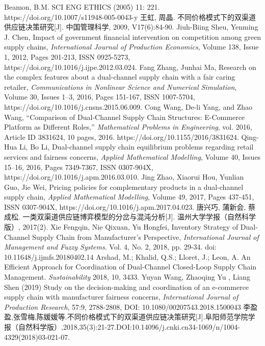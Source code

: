 \documentclass{article}
\begin{document}
\begin{thebibliography}{1}
 Beamon, B.M. SCI ENG ETHICS (2005) 11: 221. https://doi.org/10.1007/s11948-005-0043-y
 王虹, 周晶. 不同价格模式下的双渠道供应链决策研究[J]. 中国管理科学, 2009, V17(6):84-90.
 Jiuh-Biing Sheu, Yenming J. Chen, Impact of government financial intervention on competition among green supply chains, \emph{International Journal of Production Economics}, Volume 138, Issue 1, 2012, Pages 201-213, ISSN 0925-5273, https://doi.org/10.1016/j.ijpe.2012.03.024.
 Fang Zhang, Junhai Ma, Research on the complex features about a dual-channel supply chain with a fair caring retailer, \emph{Communications in Nonlinear Science and Numerical Simulation}, Volume 30, Issues 1–3, 2016, Pages 151-167, ISSN 1007-5704, https://doi.org/10.1016/j.cnsns.2015.06.009.
 Cong Wang, De-li Yang, and Zhao Wang, “Comparison of Dual-Channel Supply Chain Structures: E-Commerce Platform as Different Roles,” \emph{Mathematical Problems in Engineering}, vol. 2016, Article ID 3831624, 10 pages, 2016. https://doi.org/10.1155/2016/3831624.
 Qing-Hua Li, Bo Li, Dual-channel supply chain equilibrium problems regarding retail services and fairness concerns, \emph{Applied Mathematical Modelling}, Volume 40, Issues 15–16, 2016, Pages 7349-7367, ISSN 0307-904X, https://doi.org/10.1016/j.apm.2016.03.010.
 Jing Zhao, Xiaorui Hou, Yunlian Guo, Jie Wei, Pricing policies for complementary products in a dual-channel supply chain, \emph{Applied Mathematical Modelling}, Volume 49, 2017, Pages 437-451, ISSN 0307-904X, https://doi.org/10.1016/j.apm.2017.04.023.
 唐兴巧, 蒲新会, 蔡成松. 一类双渠道供应链博弈模型的分岔与混沌分析[J]. 温州大学学报（自然科学版）, 2017(2).
 Xie Fengqin, Nie Qixuan, Yu Hongfei, Inventory Strategy of Dual-Channel Supply Chain from Manufacturer's Perspective, \emph{International Journal of Management and Fuzzy Systems}. Vol. 4, No. 2, 2018, pp. 29-34. doi: 10.11648/j.ijmfs.20180402.14
 Arshad, M.; Khalid, Q.S.; Lloret, J.; Leon, A. An Efficient Approach for Coordination of Dual-Channel Closed-Loop Supply Chain Management. \emph{Sustainability} 2018, 10, 3433.
 Yuyan Wang, Zhaoqing Yu , Liang Shen (2019) Study on the decision-making and coordination of an e-commerce supply chain with manufacturer fairness concerns, \emph{International Journal of Production Research}, 57:9, 2788-2808, DOI: 10.1080/00207543.2018.1500043
 李盈盈,张雪梅,陈媛媛等.不同价格模式下的双渠道供应链决策研究[J].阜阳师范学院学报（自然科学版）,2018,35(3):21-27.DOI:10.14096/j.cnki.cn34-1069/n/1004-4329(2018)03-021-07.

\end{thebibliography}
\end{document}
